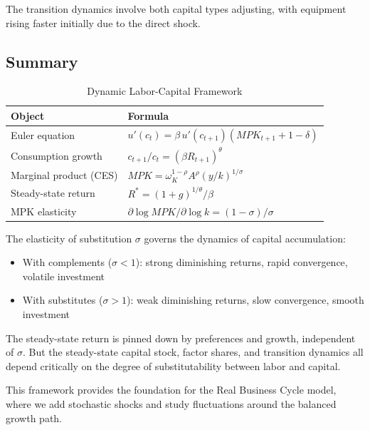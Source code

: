 The transition dynamics involve both capital types adjusting, with equipment rising faster initially due to the direct shock.

\subsection{Summary}
\label{subsec:dynamics-summary}

\begin{table}[H]
\centering
\caption{Dynamic Labor-Capital Framework}
\label{tab:dynamics-summary}
\renewcommand{\arraystretch}{1.6}
\begin{tabular}{@{}ll@{}}
\toprule
\textbf{Object} & \textbf{Formula} \\
\midrule
Euler equation & $u'(c_t) = \beta \, u'(c_{t+1}) \left( MPK_{t+1} + 1 - \delta \right)$ \\[6pt]
Consumption growth & $c_{t+1}/c_t = \left( \beta R_{t+1} \right)^\theta$ \\[6pt]
Marginal product (CES) & $MPK = \omega_K^{1-\rho} A^\rho \left( y/k \right)^{1/\sigma}$ \\[6pt]
Steady-state return & $R^* = (1+g)^{1/\theta} / \beta$ \\[6pt]
MPK elasticity & $\partial \log MPK / \partial \log k = (1-\sigma)/\sigma$ \\[6pt]
\bottomrule
\end{tabular}
\end{table}

\begin{callouttip}
The elasticity of substitution $\sigma$ governs the dynamics of capital accumulation:
\begin{itemize}[nosep]
\item With complements ($\sigma < 1$): strong diminishing returns, rapid convergence, volatile investment
\item With substitutes ($\sigma > 1$): weak diminishing returns, slow convergence, smooth investment
\end{itemize}
The steady-state return is pinned down by preferences and growth, independent of $\sigma$. But the steady-state capital stock, factor shares, and transition dynamics all depend critically on the degree of substitutability between labor and capital.

This framework provides the foundation for the Real Business Cycle model, where we add stochastic shocks and study fluctuations around the balanced growth path.
\end{callouttip}
